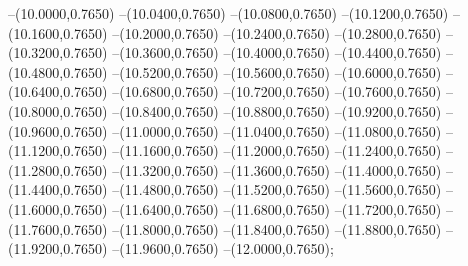 {	--(10.0000,0.7650)
	--(10.0400,0.7650)
	--(10.0800,0.7650)
	--(10.1200,0.7650)
	--(10.1600,0.7650)
	--(10.2000,0.7650)
	--(10.2400,0.7650)
	--(10.2800,0.7650)
	--(10.3200,0.7650)
	--(10.3600,0.7650)
	--(10.4000,0.7650)
	--(10.4400,0.7650)
	--(10.4800,0.7650)
	--(10.5200,0.7650)
	--(10.5600,0.7650)
	--(10.6000,0.7650)
	--(10.6400,0.7650)
	--(10.6800,0.7650)
	--(10.7200,0.7650)
	--(10.7600,0.7650)
	--(10.8000,0.7650)
	--(10.8400,0.7650)
	--(10.8800,0.7650)
	--(10.9200,0.7650)
	--(10.9600,0.7650)
	--(11.0000,0.7650)
	--(11.0400,0.7650)
	--(11.0800,0.7650)
	--(11.1200,0.7650)
	--(11.1600,0.7650)
	--(11.2000,0.7650)
	--(11.2400,0.7650)
	--(11.2800,0.7650)
	--(11.3200,0.7650)
	--(11.3600,0.7650)
	--(11.4000,0.7650)
	--(11.4400,0.7650)
	--(11.4800,0.7650)
	--(11.5200,0.7650)
	--(11.5600,0.7650)
	--(11.6000,0.7650)
	--(11.6400,0.7650)
	--(11.6800,0.7650)
	--(11.7200,0.7650)
	--(11.7600,0.7650)
	--(11.8000,0.7650)
	--(11.8400,0.7650)
	--(11.8800,0.7650)
	--(11.9200,0.7650)
	--(11.9600,0.7650)
	--(12.0000,0.7650);
}

